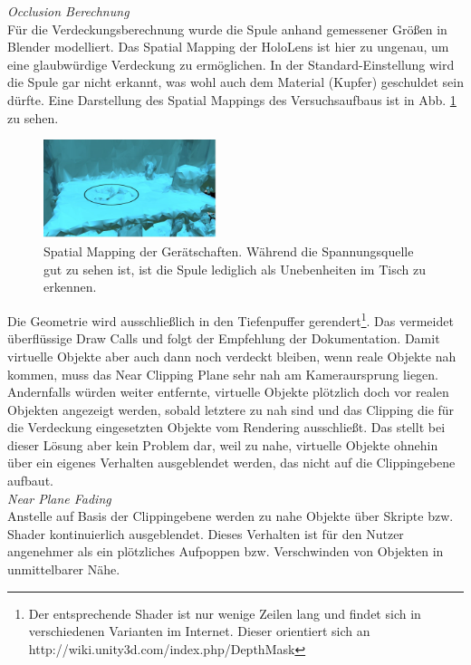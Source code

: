\textit{Occlusion Berechnung}\\
Für die Verdeckungsberechnung wurde die Spule anhand gemessener Größen in Blender modelliert. Das Spatial Mapping der HoloLens ist hier zu ungenau, um eine glaubwürdige Verdeckung zu ermöglichen. In der Standard-Einstellung wird die Spule gar nicht erkannt, was wohl auch dem Material (Kupfer) geschuldet sein dürfte. Eine Darstellung des Spatial Mappings des Versuchsaufbaus ist in Abb. \ref{img:mesh-vs-model} zu sehen.
\begin{figure}[H]
	\centering
	\includegraphics[width=0.45\textwidth]{images/HL/mesh.jpg}
	\caption{Spatial Mapping der Gerätschaften. Während die Spannungsquelle gut zu sehen ist, ist die Spule lediglich als Unebenheiten im Tisch zu erkennen.}
	\label{img:mesh-vs-model}
\end{figure}
Die Geometrie wird ausschließlich in den Tiefenpuffer gerendert\footnote{Der entsprechende Shader ist nur wenige Zeilen lang und findet sich in verschiedenen Varianten im Internet. Dieser orientiert sich an http://wiki.unity3d.com/index.php/DepthMask}. Das vermeidet überflüssige Draw Calls und folgt der Empfehlung der Dokumentation. Damit virtuelle Objekte aber auch dann noch verdeckt bleiben, wenn reale Objekte nah kommen, muss das Near Clipping Plane sehr nah am Kameraursprung liegen. Andernfalls würden weiter entfernte, virtuelle Objekte plötzlich doch vor realen Objekten angezeigt werden, sobald letztere zu nah sind und das Clipping die für die Verdeckung eingesetzten Objekte vom Rendering ausschließt. Das stellt bei dieser Lösung aber kein Problem dar, weil zu nahe, virtuelle Objekte ohnehin über ein eigenes Verhalten ausgeblendet werden, das nicht auf die Clippingebene aufbaut.\\


\textit{Near Plane Fading}\\
Anstelle auf Basis der Clippingebene werden zu nahe Objekte über Skripte bzw. Shader kontinuierlich ausgeblendet. Dieses Verhalten ist für den Nutzer angenehmer als ein plötzliches Aufpoppen bzw. Verschwinden von Objekten in unmittelbarer Nähe.\\

